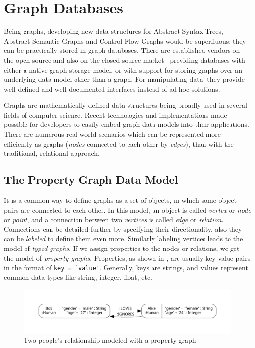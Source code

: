 \section{Graph Databases}

Being graphs, developing new data structures for Abstract Syntax Trees, Abstract Semantic Graphs and Control-Flow Graphs would be superfluous: they can be practically stored in graph databases. There are established vendors on the open-source and also on the closed-source market~\cite{ibm-graph, arangodb-graph, datastax-graph, neo4j-website, orientdb-graph} providing databases with either a native graph storage model, or with support for storing graphs over an underlying data model other than a graph. For manipulating data, they provide well-defined and well-documented interfaces instead of ad-hoc solutions.

Graphs are mathematically defined data structures being broadly used in several fields of computer science. Recent technologies and implementations made possible for developers to easily embed graph data models into their applications. There are numerous real-world scenarios which can be represented more efficiently as graphs (\emph{nodes} connected to each other by \emph{edges}), than with the traditional, relational approach.

\subsection{The Property Graph Data Model}

It is a common way to define graphs as a set of objects, in which some object pairs are connected to each other. In this model, an object is called \emph{vertex} or \emph{node} or \emph{point}, and a connection between two \emph{vertices} is called \emph{edge} or \emph{relation}. Connections can be detailed further by specifying their directionality, also they can be \emph{labeled} to define them even more. Similarly labeling vertices leads to the model of \emph{typed graphs}. If we assign properties to the nodes or relations, we get the model of \emph{property graphs}. Properties, as shown in , are usually key-value pairs in the format of \lstinline{key = `value'}. Generally, keys are strings, and values represent common data types like string, integer, float, etc.

\begin{figure}[!htb]
	\centering
	\includegraphics[width=\textwidth, trim=12mm 12mm 12mm 12mm,clip]{figures/property-graph.pdf}
	\caption{Two people's relationship modeled with a property graph}
	\label{fig:property-graph}
\end{figure}

